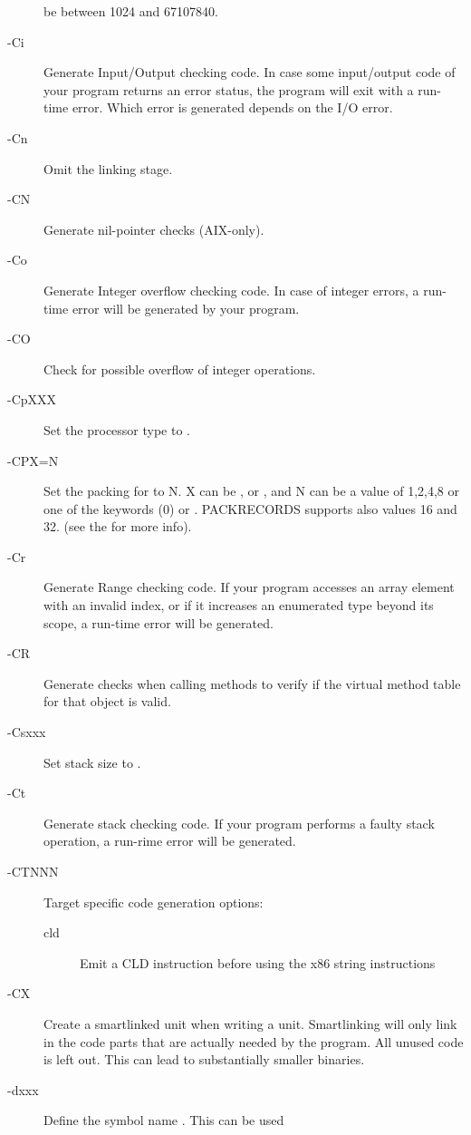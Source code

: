 \begin{description}
be between 1024 and 67107840.
\item [-Ci]  Generate Input/Output checking code. In case some
input/output code of your program returns an error status, the program will
exit with a run-time error. Which error is generated depends on the I/O error.
\item [-Cn]  Omit the linking stage.
\item [-CN]  Generate nil-pointer checks (AIX-only).
\item [-Co]  Generate Integer overflow checking code. In case of
integer errors, a run-time error will be generated by your program.
\item [-CO]  Check for possible overflow of integer operations.
\item [-CpXXX] Set the processor type to .
\item [-CPX=N] Set the packing for  to N. X can be ,
 or , and N can be a value of 1,2,4,8 or one
of the keywords  (0) or . PACKRECORDS supports also
values 16 and 32.  (see the \progref for more info).
\item [-Cr]  Generate Range checking code. If your program
accesses an array element with an invalid index, or if it increases an
enumerated type beyond its scope, a run-time error will be generated.
\item [-CR]  Generate checks when calling methods to verify
if the virtual method table for that object is valid.
\item [-Csxxx]  Set stack size to .
\item [-Ct]  Generate stack checking code. If your program
performs a faulty stack operation, a run-rime error will be generated.
\item [-CTNNN]  Target specific code generation options:
\begin{description}
\item [cld]Emit a CLD instruction before using the x86 string instructions
\end{description}
\item [-CX]  Create a smartlinked unit when writing a unit.
Smartlinking will only link in the code parts that are actually needed by
the program. All unused code is left out. This can lead to substantially
smaller binaries.
\item [-dxxx]  Define the symbol name . This can be used

\end{description}

